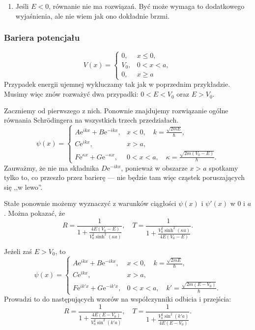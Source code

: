 \begin{enumerate}
	\item Jeśli $E < 0$, równanie nie ma rozwiązań. Być może wymaga to dodatkowego wyjaśnienia, ale nie wiem jak ono dokładnie brzmi.
\end{enumerate}

\subsubsection*{Bariera potencjału}
\begin{equation*}
	V(x) = \begin{cases}
		0, &x \leq 0,\\
		V_0, &0<x<a,\\
		0, &x\geq a
	\end{cases}
\end{equation*}
Przypadek energii ujemnej wykluczamy tak jak w poprzednim przykładzie. Musimy więc znów rozważyć dwa przypadki: $0<E<V_0$ oraz $E>V_0$.

Zaczniemy od pierwszego z nich. Ponownie znajdujemy rozwiązanie ogólne równania Schrödingera na wszystkich trzech przedziałach.
\begin{equation*}
	\psi(x) = \begin{cases}
		A\mathrm{e}^{ikx} + B\mathrm{e}^{-ikx}, &x<0, \quad k = \frac{\sqrt{2mE}}{\hbar},\\
		C\mathrm{e}^{ikx}, & x>a,\\
		F\mathrm{e}^{\kappa x} + G\mathrm{e}^{-\kappa x}, &0<x<a, \quad \kappa = \frac{\sqrt{2m(V_0 - E)}}{\hbar}.
	\end{cases}
\end{equation*}
Zauważmy, że nie ma składnika $D\mathrm{e}^{-ikx}$, ponieważ w obszarze $x>a$ spotkamy tylko to, co przeszło przez barierę --- nie będzie tam więc cząstek poruszających się ,,w lewo''.

Stałe ponownie możemy wyznaczyć z warunków ciągłości $\psi(x)$ i $\psi'(x)$ w $0$ i $a$. Można pokazać, że
\begin{equation*}
	R = \frac{1}{1 + \frac{4E(V_0 - E)}{V_0^2 \sinh^2(\kappa a)}}, \quad T = \frac{1}{1 + \frac{V_0^2 \sinh^2(\kappa a)}{4E(V_0 - E)}}.
\end{equation*}

Jeżeli zaś $E>V_0$, to
\begin{equation*}
	\psi(x) = \begin{cases}
		A\mathrm{e}^{ikx} + B\mathrm{e}^{-ikx}, &x<0, \quad k = \frac{\sqrt{2mE}}{\hbar},\\
		C\mathrm{e}^{ikx}, & x>a,\\
		F\mathrm{e}^{ik'x} + G\mathrm{e}^{-ik'x}, &0<x<a, \quad k' = \frac{\sqrt{2m(E-V_0)}}{\hbar}.
	\end{cases}
\end{equation*}
Prowadzi to do następujących wzorów na współczynniki odbicia i przejścia:
\begin{equation*}
		R = \frac{1}{1 + \frac{4E(E-V_0)}{V_0^2 \sin^2(k'a)}}, \quad T = \frac{1}{1 + \frac{V_0^2 \sin^2(k' a)}{4E(E-V_0)}}.
\end{equation*}

